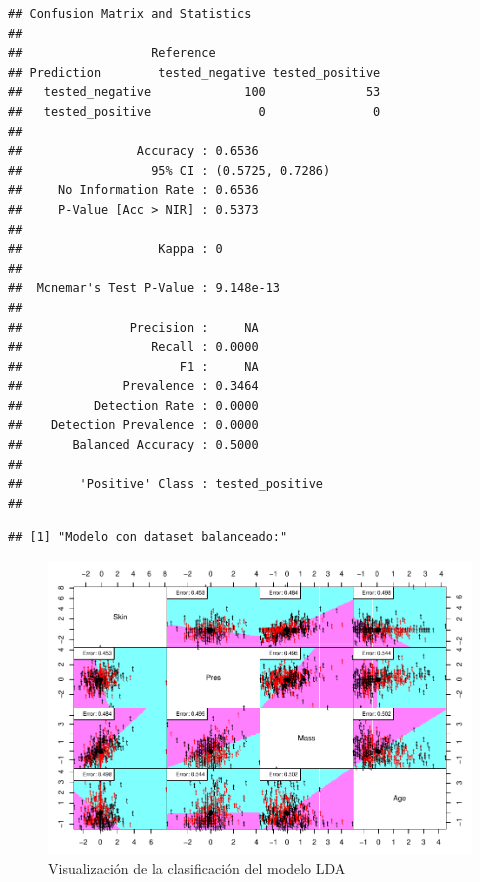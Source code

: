 \documentclass[
]{article}
\begin{document}
\begin{verbatim}
## Confusion Matrix and Statistics
## 
##                  Reference
## Prediction        tested_negative tested_positive
##   tested_negative             100              53
##   tested_positive               0               0
##                                           
##                Accuracy : 0.6536          
##                  95% CI : (0.5725, 0.7286)
##     No Information Rate : 0.6536          
##     P-Value [Acc > NIR] : 0.5373          
##                                           
##                   Kappa : 0               
##                                           
##  Mcnemar's Test P-Value : 9.148e-13       
##                                           
##               Precision :     NA          
##                  Recall : 0.0000          
##                      F1 :     NA          
##              Prevalence : 0.3464          
##          Detection Rate : 0.0000          
##    Detection Prevalence : 0.0000          
##       Balanced Accuracy : 0.5000          
##                                           
##        'Positive' Class : tested_positive 
## 
\end{verbatim}

\begin{verbatim}
## [1] "Modelo con dataset balanceado:"
\end{verbatim}

\begin{figure}

{\centering \includegraphics[width=1\linewidth]{pima-clasificacion_files/figure-latex/lda-1} 

}

\caption{Visualización de la clasificación del modelo LDA}\label{fig:lda}
\end{figure}
\end{document}
